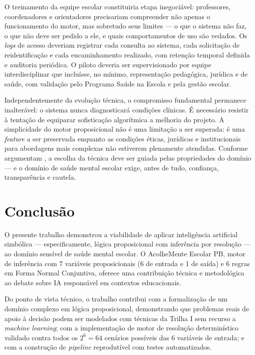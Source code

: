 \documentclass[
    12pt,
    openright,
    oneside,
    a4paper,
    english,
    brazil
]{abntex2}
\begin{document}
O treinamento da equipe escolar constituiria etapa inegoci\'avel: professores, coordenadores e orientadores precisariam compreender n\~ao apenas o funcionamento do motor, mas sobretudo seus limites --- o que o sistema n\~ao faz, o que n\~ao deve ser pedido a ele, e quais comportamentos de uso s\~ao vedados. Os \textit{logs} de acesso deveriam registrar cada consulta ao sistema, cada solicita\c{c}\~ao de reidentifica\c{c}\~ao e cada encaminhamento realizado, com reten\c{c}\~ao temporal definida e auditoria peri\'odica. O piloto deveria ser supervisionado por equipe interdisciplinar que inclu\'isse, no m\'inimo, representa\c{c}\~ao pedag\'ogica, jur\'idica e de sa\'ude, com valida\c{c}\~ao pelo Programa Sa\'ude na Escola \cite{brasil_pse_2007} e pela gest\~ao escolar.

Independentemente da evolu\c{c}\~ao t\'ecnica, o compromisso fundamental permanece inalter\'avel: o sistema nunca diagnosticar\'a condi\c{c}\~oes cl\'inicas. \'E necess\'ario resistir \`a tenta\c{c}\~ao de equiparar sofistica\c{c}\~ao algor\'itmica a melhoria do projeto. A simplicidade do motor proposicional n\~ao \'e uma limita\c{c}\~ao a ser superada: \'e uma \textit{feature} a ser preservada enquanto as condi\c{c}\~oes \'eticas, jur\'idicas e institucionais para abordagens mais complexas n\~ao estiverem plenamente atendidas. Conforme argumentam , a escolha da t\'ecnica deve ser guiada pelas propriedades do dom\'inio --- e o dom\'inio de sa\'ude mental escolar exige, antes de tudo, confian\c{c}a, transpar\^encia e cautela.

\chapter{Conclus\~ao}

O presente trabalho demonstrou a viabilidade de aplicar intelig\^encia artificial simb\'olica --- especificamente, l\'ogica proposicional com infer\^encia por resolu\c{c}\~ao --- ao dom\'inio sens\'ivel de sa\'ude mental escolar. O AcolheMente Escolar PB, motor de infer\^encia com 7 vari\'aveis proposicionais (6 de entrada e 1 de sa\'ida) e 6 regras em Forma Normal Conjuntiva, oferece uma contribui\c{c}\~ao t\'ecnica e metodol\'ogica ao debate sobre IA respons\'avel em contextos educacionais.

Do ponto de vista t\'ecnico, o trabalho contribui com a formaliza\c{c}\~ao de um dom\'inio complexo em l\'ogica proposicional, demonstrando que problemas reais de apoio \`a decis\~ao podem ser modelados com t\'ecnicas da Trilha I sem recurso a \textit{machine learning}; com a implementa\c{c}\~ao de motor de resolu\c{c}\~ao determin\'istico validado contra todos os $2^6 = 64$ cen\'arios poss\'iveis das 6 vari\'aveis de entrada; e com a constru\c{c}\~ao de \textit{pipeline} reprodut\'ivel com testes automatizados.
\end{document}
